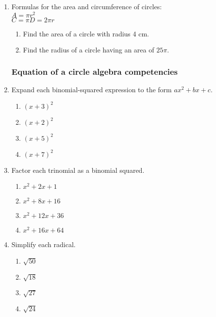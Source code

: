\documentclass[12pt, twoside]{article}
\begin{document}
\begin{enumerate}
\item Formulas for the area and circumference of circles:\\
  $A=\pi r^2$\\
  $C=\pi D = 2\pi r$
    \begin{enumerate}
    \item Find the area of a circle with radius 4 cm.
    \item Find the radius of a circle having an area of $25 \pi$.
    \end{enumerate}

\newpage
\subsubsection*{Equation of a circle algebra competencies} 

\item Expand each binomial-squared expression to the form $ax^2+bx+c$.
  \begin{multicols}{2}
  \begin{enumerate}[itemsep=2cm]
    \item $(x+3)^2$
    \item $(x+2)^2$ 
    \item $(x+5)^2$ 
    \item $(x+7)^2$ 
  \end{enumerate}
  \end{multicols}\vspace{2cm}

\item Factor each trinomial as a binomial squared.
  \begin{multicols}{2}
    \begin{enumerate}[itemsep=2cm]
      \item $x^2+2x+1$ 
      \item $x^2+8x+16$
      \item $x^2+12x+36$ 
      \item $x^2+16x+64$ 
    \end{enumerate}
    \end{multicols}\vspace{2cm}

\item Simplify each radical.
  \begin{multicols}{2}
    \begin{enumerate}[itemsep=2cm]
      \item $\sqrt{50}$ 
      \item $\sqrt{18}$
      \item $\sqrt{27}$ 
      \item $\sqrt{24}$ 
    \end{enumerate}
    \end{multicols}\vspace{2cm}
    

\end{enumerate}
\end{document}
